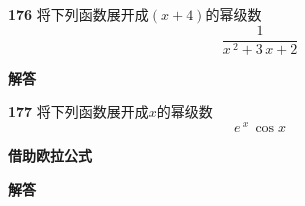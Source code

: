 \documentclass[a4paper,10pt]{article} %
\begin{document}

\textheight


\par\noindent \textbf{176} \quad 将下列函数展开成$(x+4)$的幂级数
$$\frac {1}{x\,^2+3\,x+2}$$
\par\noindent \textbf{ 解答}




\textheight


\par\noindent \textbf{177} \quad 将下列函数展开成$x$的幂级数
$$e\,^x\,\cos x$$
\par\noindent \textbf{ 借助欧拉公式}
\par\noindent \textbf{ 解答}



\newpage

\end{document}
